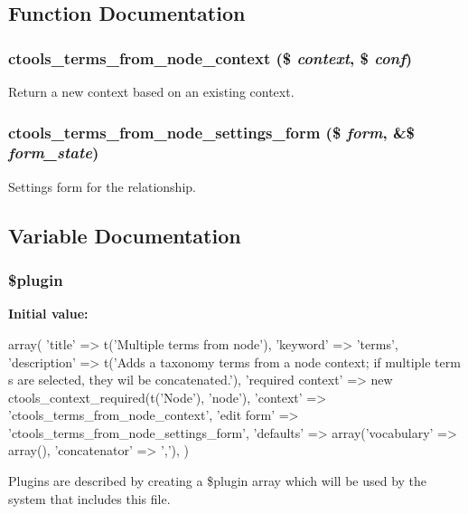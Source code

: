 \subsection{Function Documentation}
\hypertarget{terms__from__node_8inc_a16cd498426fdaade5d956722e1d2b8bc}{
\subsubsection[{ctools\_\-terms\_\-from\_\-node\_\-context}]{\setlength{\rightskip}{0pt plus 5cm}ctools\_\-terms\_\-from\_\-node\_\-context (\$ {\em context}, \/  \$ {\em conf})}}
\label{terms__from__node_8inc_a16cd498426fdaade5d956722e1d2b8bc}
Return a new context based on an existing context. \hypertarget{terms__from__node_8inc_aaa1332803d1e2198d1bc147d84038734}{
\subsubsection[{ctools\_\-terms\_\-from\_\-node\_\-settings\_\-form}]{\setlength{\rightskip}{0pt plus 5cm}ctools\_\-terms\_\-from\_\-node\_\-settings\_\-form (\$ {\em form}, \/  \&\$ {\em form\_\-state})}}
\label{terms__from__node_8inc_aaa1332803d1e2198d1bc147d84038734}
Settings form for the relationship. 

\subsection{Variable Documentation}
\hypertarget{terms__from__node_8inc_ada8a7130088351710bb02ed622d6bf65}{
\subsubsection[{\$plugin}]{\setlength{\rightskip}{0pt plus 5cm}\$plugin}}
\label{terms__from__node_8inc_ada8a7130088351710bb02ed622d6bf65}
{\bfseries Initial value:}
\begin{DoxyCode}
 array(
  'title' => t('Multiple terms from node'),
  'keyword' => 'terms',
  'description' => t('Adds a taxonomy terms from a node context; if multiple term
      s are selected, they wil be concatenated.'),
  'required context' => new ctools_context_required(t('Node'), 'node'),
  'context' => 'ctools_terms_from_node_context',
  'edit form' => 'ctools_terms_from_node_settings_form',
  'defaults' => array('vocabulary' => array(), 'concatenator' => ','),
)
\end{DoxyCode}
Plugins are described by creating a \$plugin array which will be used by the system that includes this file. 